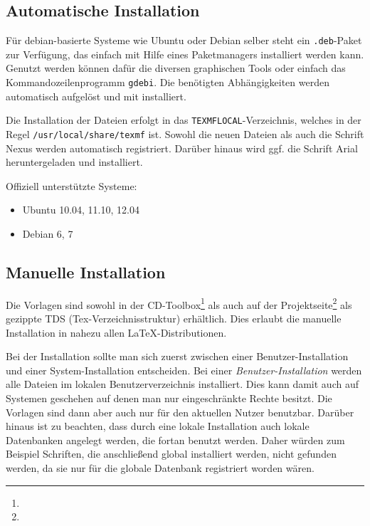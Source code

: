 \subsection{Automatische Installation}

Für debian-basierte Systeme wie Ubuntu oder Debian selber steht ein
\texttt{.deb}-Paket zur Verfügung, das einfach mit Hilfe eines Paketmanagers
installiert werden kann.
Genutzt werden können dafür die diversen graphischen Tools oder einfach das
Kommandozeilenprogramm \texttt{gdebi}. Die benötigten Abhängigkeiten
werden automatisch aufgelöst und mit installiert.

Die Installation der Dateien erfolgt in das \texttt{TEXMFLOCAL}-Verzeichnis,
welches in der Regel \lstinline{/usr/local/share/texmf} ist.
Sowohl die neuen Dateien als auch die Schrift Nexus werden automatisch registriert.
Darüber hinaus wird ggf. die Schrift Arial heruntergeladen und installiert.

Offiziell unterstützte Systeme:
\begin{itemize}
  \item Ubuntu 10.04, 11.10, 12.04
  \item Debian 6, 7
\end{itemize}


\subsection{Manuelle Installation}


Die Vorlagen sind sowohl in der CD-Toolbox\footnote{\urltoolbox}
als auch auf der Projektseite\footnote{\urltubslatex} als gezippte
TDS (Tex-Verzeichnisstruktur) erhältlich.
Dies erlaubt die manuelle Installation in nahezu allen \LaTeX-Distributionen.

Bei der Installation sollte man sich zuerst zwischen einer Benutzer-Installation
und einer System-Installation entscheiden.
Bei einer \emph{Benutzer-Installation} werden alle Dateien im lokalen Benutzerverzeichnis installiert.
Dies kann damit auch auf Systemen geschehen auf denen man nur
eingeschränkte Rechte besitzt.
Die Vorlagen sind dann aber auch nur für den aktuellen Nutzer benutzbar.
Darüber hinaus ist zu beachten, dass durch eine lokale Installation auch
lokale Datenbanken angelegt werden, die fortan benutzt werden.
Daher würden zum Beispiel Schriften, die anschließend global installiert werden,
nicht gefunden werden, da sie nur für die globale Datenbank registriert worden wären.


